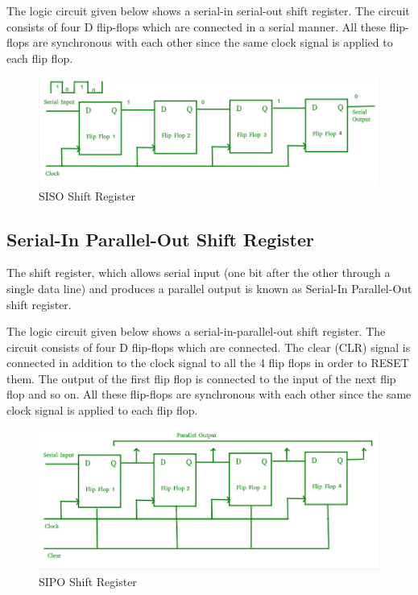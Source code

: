 \documentclass[12pt]{article}
\begin{document}
\noindent The logic circuit given below shows a serial-in serial-out shift register. The circuit consists of four D flip-flops which are connected in a serial manner. All these flip-flops are synchronous with each other since the same clock signal is applied to each flip flop.
\begin{figure}[H]
    \centering
    \includegraphics[scale=0.6]{circuit diagram/SISO.png}
    \caption{SISO Shift Register}
\end{figure}
\subsection{Serial-In Parallel-Out Shift Register}
The shift register, which allows serial input (one bit after the other through a single data line) and produces a parallel output is known as Serial-In Parallel-Out shift register.

\noindent The logic circuit given below shows a serial-in-parallel-out shift register. The circuit consists of four D flip-flops which are connected. The clear (CLR) signal is connected in addition to the clock signal to all the 4 flip flops in order to RESET them. The output of the first flip flop is connected to the input of the next flip flop and so on. All these flip-flops are synchronous with each other since the same clock signal is applied to each flip flop.
\begin{figure}[H]
    \centering
    \includegraphics[scale=0.6]{circuit diagram/SIPO.png}
    \caption{SIPO Shift Register}
\end{figure}
\end{document}
